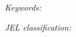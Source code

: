 \documentclass[11pt]{article}
\title{\papertitle}
\author{\paperauthors\\\small\paperaffiliations}
\date{\paperdate}
\begin{document}
\maketitle

\begin{abstract}
  
\end{abstract}

\noindent\textit{Keywords:} \paperkeywords

\medskip

\noindent\textit{JEL classification:} \paperjel






\end{document}
